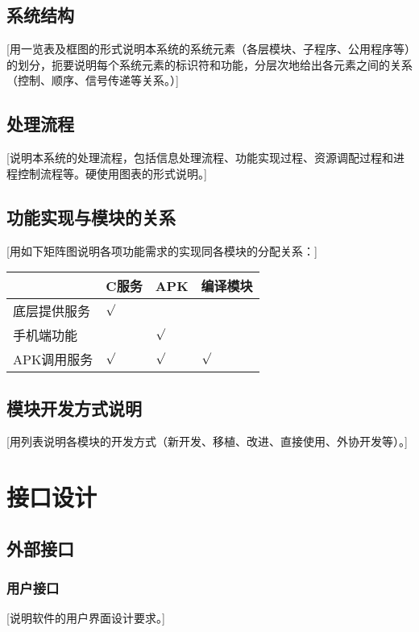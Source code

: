 \documentclass[10pt,a4paper,titlepage]{article} %
\begin{document}
\subsection{系统结构}
[用一览表及框图的形式说明本系统的系统元素（各层模块、子程序、公用程序等）的划分，扼要说明每个系统元素的标识符和功能，分层次地给出各元素之间的关系（控制、顺序、信号传递等关系。）]\newline
\subsection{处理流程}
[说明本系统的处理流程，包括信息处理流程、功能实现过程、资源调配过程和进程控制流程等。硬使用图表的形式说明。] \newline
\subsection{功能实现与模块的关系}
[用如下矩阵图说明各项功能需求的实现同各模块的分配关系：]
\begin{center}  
\begin{tabular}{|m{3cm}<{\centering}|m{3cm}<{\centering}|m{3cm}<{\centering}|m{3cm}<{\centering}|}
\hline  
           & C服务 	 & APK     & 编译模块  \\ \hline  
 底层提供服务 & $\surd$ &         &     \\ \hline
 手机端功能 &         & $\surd$ &     \\ \hline
 APK调用服务 & $\surd$ & $\surd$ &  $\surd$  \\ \hline
\end{tabular}  
\end{center}  

\subsection{模块开发方式说明}
[用列表说明各模块的开发方式（新开发、移植、改进、直接使用、外协开发等）。]\newline
\section{接口设计}
\subsection{外部接口}
\subsubsection{用户接口}
[说明软件的用户界面设计要求。]\newline
\end{document}
